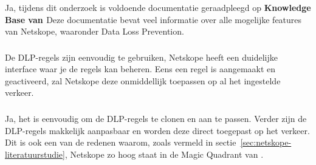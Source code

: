 
\subsubsection{}

Ja, tijdens dit onderzoek is voldoende documentatie geraadpleegd op \textbf{Knowledge Base van \textcite{Netskope2025Docs}}
Deze documentatie bevat veel informatie over alle mogelijke features van Netskope, waaronder Data Loss Prevention.

\subsubsection{}

De DLP-regels zijn eenvoudig te gebruiken, Netskope heeft een duidelijke interface waar je de regels kan beheren.
Eens een regel is aangemaakt en geactiveerd, zal Netskope deze onmiddellijk toepassen op al het ingestelde verkeer.

\subsubsection{}

Ja, het is eenvoudig om de DLP-regels te clonen en aan te passen.
Verder zijn de DLP-regels makkelijk aanpasbaar en worden deze direct toegepast op het verkeer.
Dit is ook een van de redenen waarom, zoals vermeld in sectie~\ref{sec:netskope-literatuurstudie}, Netskope zo hoog staat in de Magic Quadrant van \textcite{Gartner2024}.




